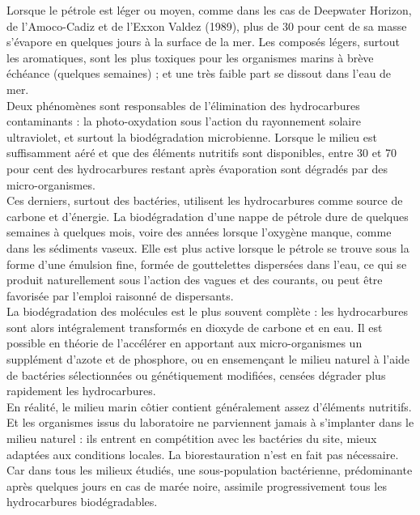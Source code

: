 \documentclass[8pt]{article}
\begin{document}
Lorsque le pétrole est léger ou moyen, comme dans les cas de Deepwater Horizon, de l'Amoco-Cadiz et de l'Exxon Valdez (1989), plus de 30 pour cent de sa masse s'évapore en quelques jours à la surface de la mer. Les composés légers, surtout les aromatiques, sont les plus toxiques pour les organismes marins à brève échéance (quelques semaines) ; et une très faible part se dissout dans l'eau de mer.\\

Deux phénomènes sont responsables de l'élimination des hydrocarbures contaminants : la photo-oxydation sous l'action du rayonnement solaire ultraviolet, et surtout la biodégradation microbienne. Lorsque le milieu est suffisamment aéré et que des éléments nutritifs sont disponibles, entre 30 et 70 pour cent des hydrocarbures restant après évaporation sont dégradés par des micro-organismes.\\

Ces derniers, surtout des bactéries, utilisent les hydrocarbures comme source de carbone et d'énergie. La biodégradation d'une nappe de pétrole dure de quelques semaines à quelques mois, voire des années lorsque l'oxygène manque, comme dans les sédiments vaseux. Elle est plus active lorsque le pétrole se trouve sous la forme d'une émulsion fine, formée de gouttelettes dispersées dans l'eau, ce qui se produit naturellement sous l'action des vagues et des courants, ou peut être favorisée par l'emploi raisonné de dispersants.\\

La biodégradation des molécules est le plus souvent complète : les hydrocarbures sont alors intégralement transformés en dioxyde de carbone et en eau. Il est possible en théorie de l'accélérer en apportant aux micro-organismes un supplément d'azote et de phosphore, ou en ensemençant le milieu naturel à l'aide de bactéries sélectionnées ou génétiquement modifiées, censées dégrader plus rapidement les hydrocarbures.\\

En réalité, le milieu marin côtier contient généralement assez d'éléments nutritifs. Et les organismes issus du laboratoire ne parviennent jamais à s'implanter dans le milieu naturel : ils entrent en compétition avec les bactéries du site, mieux adaptées aux conditions locales. La biorestauration n'est en fait pas nécessaire. Car dans tous les milieux étudiés, une sous-population bactérienne, prédominante après quelques jours en cas de marée noire, assimile progressivement tous les hydrocarbures biodégradables.\\
\end{document}
